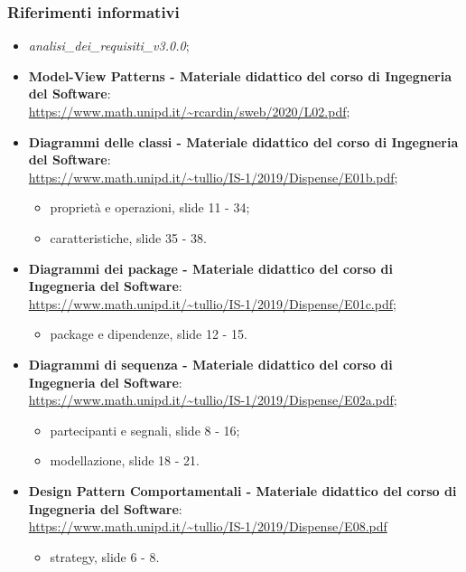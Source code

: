 \subsubsection{Riferimenti informativi}
\begin{itemize}
	\item \textit{analisi\_dei\_requisiti\_v3.0.0};
	\item \textbf{Model-View Patterns - Materiale didattico del corso di Ingegneria del Software}: \\
	\url{https://www.math.unipd.it/~rcardin/sweb/2020/L02.pdf};
	\item \textbf{Diagrammi delle classi - Materiale didattico del corso di Ingegneria del Software}: \\
	\url{https://www.math.unipd.it/~tullio/IS-1/2019/Dispense/E01b.pdf};
	\begin{itemize}
		\item proprietà e operazioni, slide 11 - 34;
		\item caratteristiche, slide 35 - 38.
	\end{itemize}
	\item \textbf{Diagrammi dei package - Materiale didattico del corso di Ingegneria del Software}: \\
	\url{https://www.math.unipd.it/~tullio/IS-1/2019/Dispense/E01c.pdf};
	\begin{itemize}
		\item package e dipendenze, slide 12 - 15.
	\end{itemize}
	\item \textbf{Diagrammi di sequenza - Materiale didattico del corso di Ingegneria del Software}: \\
	\url{https://www.math.unipd.it/~tullio/IS-1/2019/Dispense/E02a.pdf};
	\begin{itemize}
		\item partecipanti e segnali, slide 8 - 16;
		\item modellazione, slide 18 - 21.
	\end{itemize}
	\item \textbf{Design Pattern Comportamentali - Materiale didattico del corso di Ingegneria del Software}: \\
	\url{https://www.math.unipd.it/~tullio/IS-1/2019/Dispense/E08.pdf}
	\begin{itemize}
		\item strategy, slide 6 - 8.
	\end{itemize}
\end{itemize}